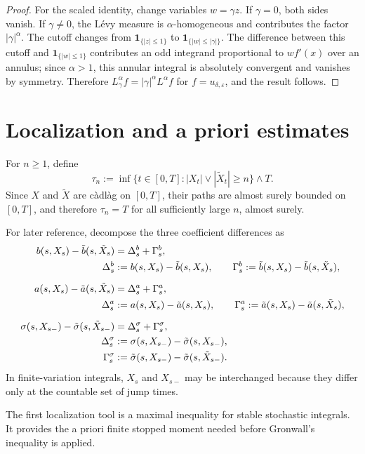\documentclass[10pt,a4paper]{amsart}
\newcommand{\1}{\mathbf{1}}
\newcommand{\wt}{\tilde}
\newcommand{\eps}{\varepsilon}
\begin{document}
\begin{proof}
For the scaled identity, change variables $w=\gamma z$. If $\gamma=0$, both sides vanish. If $\gamma\ne0$, the L\'evy measure is $\alpha$-homogeneous and contributes the factor $|\gamma|^\alpha$. The cutoff changes from $\1_{\{|z|\le1\}}$ to $\1_{\{|w|\le |\gamma|\}}$. The difference between this cutoff and $\1_{\{|w|\le1\}}$ contributes an odd integrand proportional to $w f'(x)$ over an annulus; since $\alpha>1$, this annular integral is absolutely convergent and vanishes by symmetry. Therefore $L^\alpha_\gamma f=|\gamma|^\alpha L^\alpha f$ for $f=u_{\delta,\eps}$, and the result follows.
\end{proof}


\section{Localization and a priori estimates}
\label{sec:localization}

For $n\ge1$, define
\[
  \tau_n:=\inf\{t\in[0,T]: |X_t|\vee |\wt X_t|\ge n\}\wedge T.
\]
Since $X$ and $\wt X$ are c\`adl\`ag on $[0,T]$, their paths are almost surely bounded on $[0,T]$, and therefore $\tau_n=T$ for all sufficiently large $n$, almost surely.

For later reference, decompose the three coefficient differences as
\begin{align}
b(s,X_s)-\wt b(s,\wt X_s)&=\Delta_s^b+\Gamma_s^b,
\label{eq:drift-coefficient-difference}\\
\Delta_s^b&:=b(s,X_s)-\wt b(s,X_s),\qquad
\Gamma_s^b:=\wt b(s,X_s)-\wt b(s,\wt X_s), \notag\\[2mm]
a(s,X_s)-\wt a(s,\wt X_s)&=\Delta_s^a+\Gamma_s^a,
\label{eq:diffusion-coefficient-difference}\\
\Delta_s^a&:=a(s,X_s)-\wt a(s,X_s),\qquad
\Gamma_s^a:=\wt a(s,X_s)-\wt a(s,\wt X_s), \notag\\[2mm]
\sigma(s,X_{s-})-\wt\sigma(s,\wt X_{s-})&=\Delta_s^\sigma+\Gamma_s^\sigma,
\label{eq:jump-coefficient-difference}\\
\Delta_s^\sigma&:=\sigma(s,X_{s-})-\wt\sigma(s,X_{s-}), \notag\\
\Gamma_s^\sigma&:=\wt\sigma(s,X_{s-})-\wt\sigma(s,\wt X_{s-}). \notag
\end{align}
In finite-variation integrals, $X_s$ and $X_{s-}$ may be interchanged because they differ only at the countable set of jump times.

The first localization tool is a maximal inequality for stable stochastic integrals. It provides the a priori finite stopped moment needed before Gronwall's inequality is applied.
\end{document}
